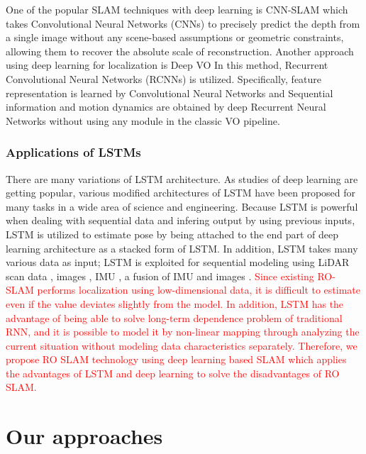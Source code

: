 \documentclass[letterpaper, 10 pt, conference]{ieeeconf}  %
\begin{document}
One of the popular SLAM techniques with deep learning is CNN-SLAM \cite{tateno2017cnn} which takes Convolutional Neural Networks (CNNs) to precisely predict the depth from a single image without any scene-based assumptions or geometric constraints, allowing them to recover the absolute scale of reconstruction. Another approach using deep learning for localization is Deep VO \cite{clark2017vinet} In this method, Recurrent Convolutional Neural Networks (RCNNs) is utilized. Specifically, feature representation is learned by Convolutional Neural Networks and Sequential information and motion dynamics are obtained by deep Recurrent Neural Networks without using any module in the classic VO pipeline.



\subsubsection{Applications of LSTMs}

There are many variations of LSTM architecture. As studies of deep learning are getting popular, various modified architectures of LSTM have been proposed for many tasks in a wide area of science and engineering. Because LSTM is powerful when dealing with sequential data and infering output by using previous inputs, LSTM is utilized to estimate pose by being attached to the end part of deep learning architecture \cite{wang2017deepvo, kendall2015posenet, turan2018deep}  as a stacked form of LSTM. In addition, LSTM takes many various data as input; LSTM is exploited for sequential modeling using LiDAR scan data \cite{gladh2016deep}, images \cite{walch2017image, wang2017deepvo}, IMU \cite{ordonez2016deep}, a fusion of IMU and images \cite{clark2017vinet}. \textcolor{red}{Since existing RO-SLAM performs localization using low-dimensional data, it is difficult to estimate even if the value deviates slightly from the model. In addition, LSTM has the advantage of being able to solve long-term dependence problem of traditional RNN, and it is possible to model it by non-linear mapping through analyzing the current situation without modeling data characteristics separately. Therefore, we propose RO SLAM technology using deep learning based SLAM which applies the advantages of LSTM and deep learning to solve the disadvantages of RO SLAM.}


\section{Our approaches}
\end{document}
